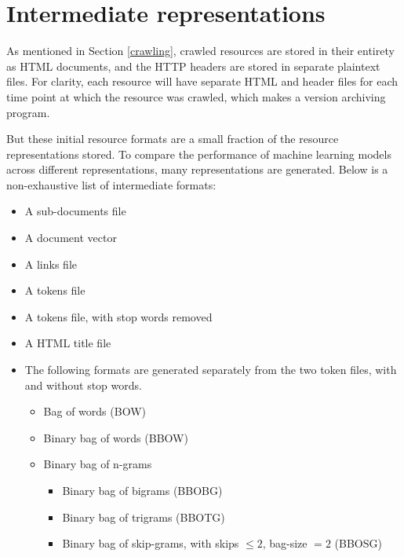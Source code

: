 \section{Intermediate representations\label{repr}}
As mentioned in Section \ref{crawling}, crawled resources are stored
in their entirety as HTML documents, and the HTTP headers are
stored in separate plaintext files.  For clarity, each
resource will have separate HTML and header files for each
time point at which the resource was crawled, which makes
\nr{} a version archiving program.

But these initial resource formats are a small fraction of the
resource representations stored.  To compare the performance of
machine learning models across different representations,
many representations are generated. Below is a non-exhaustive
list of intermediate formats:
\begin{itemize}
    \item A sub-documents file
    \item A document vector
    \item A links file
    \item A tokens file
    \item A tokens file, with stop words removed
    \item A HTML title file
    \item The following formats are generated separately from the
          two token files, with and without stop words.
    \begin{itemize}
        \item Bag of words (BOW)
        \item Binary bag of words (BBOW)
        \item Binary bag of n-grams
        \begin{itemize}
            \item Binary bag of bigrams (BBOBG)
            \item Binary bag of trigrams (BBOTG)
            \item Binary bag of skip-grams, with skips
                  $\le 2$, bag-size $= 2$ (BBOSG)
        \end{itemize}
    \end{itemize}
\end{itemize}
